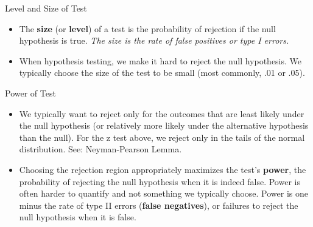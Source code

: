 \begin{frame}{Level and Size of Test}
\begin{itemize}
	\item The {\bf size} (or {\bf level}) of a test is the probability of rejection if the null hypothesis is true. 
	\emph{The size is the rate of false positives or type I errors.}

	\item When hypothesis testing, we make it hard to reject the null hypothesis. We typically choose the 
	size of the test to be small (most commonly, .01 or .05).

\end{itemize}
\end{frame}




\begin{frame}{Power of Test}
\begin{itemize}

	\item We typically want to reject only for the outcomes that are least likely under the null
	hypothesis (or relatively more likely under the alternative hypothesis than the null). For
	the z test above, we reject only in the tails of the normal distribution. See: Neyman-Pearson Lemma.
	
	\medskip
	\item Choosing the rejection region appropriately maximizes the test's {\bf power}, the 
	probability of rejecting the null hypothesis when it is indeed false. Power is often harder
	to quantify and not something we typically choose. Power is one minus the rate of
	type II errors (\textbf{false negatives}), or failures to reject the null hypothesis when it is false. 
\end{itemize}
\end{frame}



